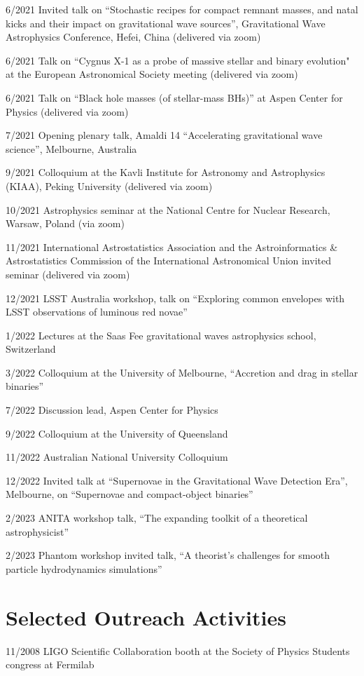 \documentclass[margin,line]{res}
\begin{document}
\begin{resume}
6/2021 Invited talk on ``Stochastic recipes for compact remnant masses, and natal kicks and their impact on gravitational wave sources'', Gravitational Wave Astrophysics Conference, Hefei, China  (delivered via zoom)

6/2021 Talk on ``Cygnus X-1 as a probe of massive stellar and binary evolution" at the European Astronomical Society meeting (delivered via zoom)

6/2021 Talk on ``Black hole masses (of stellar-mass BHs)'' at Aspen Center for Physics (delivered via zoom)

7/2021 Opening plenary talk, Amaldi 14 ``Accelerating gravitational wave science'', Melbourne, Australia

9/2021 Colloquium at the Kavli Institute for Astronomy and Astrophysics (KIAA), Peking University (delivered via zoom)

10/2021 Astrophysics seminar at the National Centre for Nuclear Research, Warsaw, Poland (via zoom)

11/2021 International Astrostatistics Association and the Astroinformatics \& Astrostatistics Commission of the International Astronomical Union invited seminar (delivered via zoom)

12/2021 LSST Australia workshop, talk on ``Exploring common envelopes with LSST observations of luminous red novae''

1/2022 Lectures at the Saas Fee gravitational waves astrophysics school, Switzerland

3/2022 Colloquium at the University of Melbourne, ``Accretion and drag in stellar binaries'' 

7/2022 Discussion lead, Aspen Center for Physics

9/2022 Colloquium at the University of Queensland

11/2022 Australian National University Colloquium

12/2022	Invited talk at ``Supernovae in the Gravitational Wave Detection Era'', Melbourne, on ``Supernovae and compact-object binaries''

2/2023	ANITA workshop talk, ``The expanding toolkit of a theoretical astrophysicist''

2/2023	Phantom workshop invited talk, ``A theorist's challenges for smooth particle hydrodynamics simulations''

\newpage

\section{\sc Selected Outreach Activities}
11/2008 	LIGO Scientific Collaboration booth at the Society of Physics Students congress at Fermilab


\end{resume}
\end{document}
